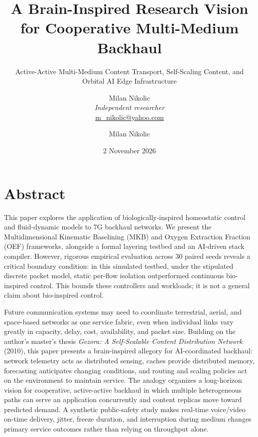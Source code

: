 \documentclass[
  american,
  11pt,
]{article}
\author{Milan Nikolic\\
    \textit{Independent researcher}\\
    \href{mailto:m_nikolic@yahoo.com}{m\_nikolic@yahoo.com}}%
\title{A Brain-Inspired Research Vision for Cooperative Multi-Medium
Backhaul}
\subtitle{Active-Active Multi-Medium Content Transport, Self-Scaling
Content, and Orbital AI Edge Infrastructure}
\author{Milan Nikolic}
\date{2 November 2026}
\begin{document}
\maketitle

{
\setcounter{tocdepth}{3}
\tableofcontents
}
\section*{Abstract}\label{abstract}

This paper explores the application of biologically-inspired homeostatic
control and fluid-dynamic models to 7G backhaul networks. We present the
Multidimensional Kinematic Baselining (MKB) and Oxygen Extraction
Fraction (OEF) frameworks, alongside a formal layering testbed and an
AI-driven stack compiler. However, rigorous empirical evaluation across
30 paired seeds reveals a critical boundary condition: in this simulated
testbed, under the stipulated discrete packet model, static per-flow
isolation outperformed continuous bio-inspired control. This bounds
these controllers and workloads; it is not a general claim about
bio-inspired control.

Future communication systems may need to coordinate terrestrial, aerial,
and space-based networks as one service fabric, even when individual
links vary greatly in capacity, delay, cost, availability, and packet
size. Building on the author's master's thesis \emph{Gezora: A
Self-Scalable Content Distribution Network} (2010), this paper presents
a brain-inspired allegory for AI-coordinated backhaul: network telemetry
acts as distributed sensing, caches provide distributed memory,
forecasting anticipates changing conditions, and routing and scaling
policies act on the environment to maintain service. The analogy
organizes a long-horizon vision for cooperative, active-active backhaul
in which multiple heterogeneous paths can serve an application
concurrently and content replicas move toward predicted demand. A
synthetic public-safety study makes real-time voice/video on-time
delivery, jitter, freeze duration, and interruption during medium
changes primary service outcomes rather than relying on throughput
alone.
\end{document}
